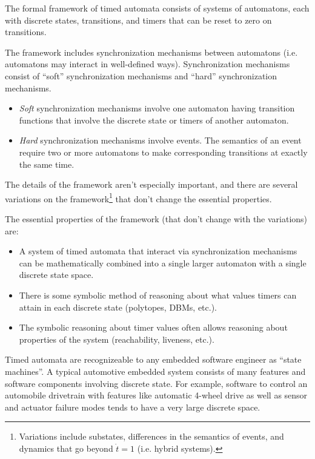 \documentclass[letterpaper,10pt,titlepage]{article}
\begin{document}
The formal framework of timed automata consists of systems of 
automatons, each with discrete states, transitions, and
timers that can be reset to zero on transitions.

The framework includes synchronization mechanisms between automatons (i.e.
automatons may interact in well-defined ways)\@. Synchronization mechanisms 
consist of ``soft'' synchronization mechanisms and ``hard'' synchronization
mechanisms.

\begin{itemize}
\item \emph{Soft} synchronization mechanisms involve one automaton having transition
      functions that involve the discrete state or timers of another automaton.
\item \emph{Hard} synchronization mechanisms involve events.  The semantics 
      of an event require two or more
      automatons to make corresponding transitions at exactly the same time.
\end{itemize}

The details of the framework aren't especially important, 
and there are several 
variations on the framework\footnote{Variations include
substates, differences in the semantics of events, and dynamics that go beyond
$\dot{t} = 1$ (i.e. hybrid systems).} that don't change the essential properties.

The essential properties of the framework (that don't change with the variations) are:

\begin{itemize}
\item A system of timed automata that interact via synchronization
      mechanisms can be mathematically combined into a single
      larger automaton with a single
      discrete state space.
\item There is some symbolic method of reasoning about what values 
      timers can attain in each discrete state (polytopes, DBMs, etc.).
\item The symbolic reasoning about timer values often allows reasoning about
      properties of the system (reachability, liveness, etc.).
\end{itemize}

Timed automata are recognizeable to any embedded software engineer as 
``state machines''.  A typical automotive embedded system consists of many 
features and software components involving discrete state.  For example, 
software to control an automobile drivetrain with features like automatic 4-wheel drive
as well as sensor and actuator failure modes tends to have a very large discrete
space.
\end{document}
